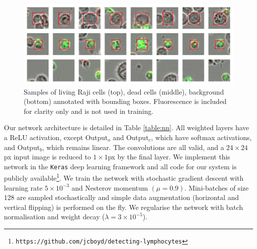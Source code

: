 \begin{figure}[htb]
\centering
\includegraphics[width=\textwidth]{img/crops.pdf}
\caption{Samples of living Raji cells (top), dead cells (middle), background (bottom) annotated with bounding boxes. Fluorescence is included for clarity only and is not used in training.}
\label{fig:crops}
\end{figure}


Our network architecture is detailed in Table \ref{table:nn}. All weighted layers have a ReLU activation, except Output$_o$ and Output$_c$, which have softmax activations, and Output$_b$, which remains linear. The convolutions are all valid, and a $24\times24$px input image is reduced to $1\times1$px by the final layer. We implement this network in the \texttt{Keras} deep learning framework\cite{chollet2015keras} and all code for our system is publicly available\footnote{\texttt{https://github.com/jcboyd/detecting-lymphocytes}}. We train the network with stochastic gradient descent with learning rate $5 \times 10^{-3}$ and Nesterov momentum $(\mu = 0.9)$. Mini-batches of size 128 are sampled stochastically and simple data augmentation (horizontal and vertical flipping) is performed on the fly. We regularise the network with batch normalisation \cite{ioffe2015batch} and weight decay ($\lambda = 3 \times 10^{-5}$).

